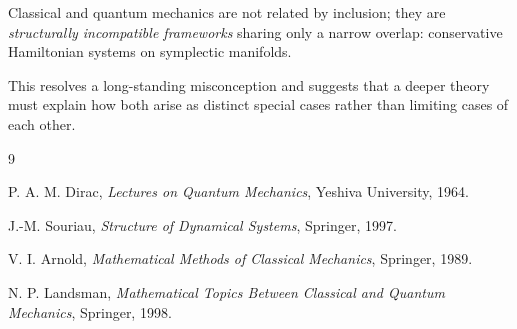 \documentclass[12pt]{article}
\begin{document}
Classical and quantum mechanics are not related by inclusion; they are \emph{structurally incompatible frameworks} sharing only a narrow overlap: conservative Hamiltonian systems on symplectic manifolds.

This resolves a long-standing misconception and suggests that a deeper theory must explain how both arise as distinct special cases rather than limiting cases of each other.



\begin{thebibliography}{9}

P. A. M. Dirac,
\textit{Lectures on Quantum Mechanics},
Yeshiva University, 1964.

J.-M. Souriau,
\textit{Structure of Dynamical Systems},
Springer, 1997.

V. I. Arnold,
\textit{Mathematical Methods of Classical Mechanics},
Springer, 1989.

N. P. Landsman,
\textit{Mathematical Topics Between Classical and Quantum Mechanics},
Springer, 1998.

\end{thebibliography}
\end{document}
